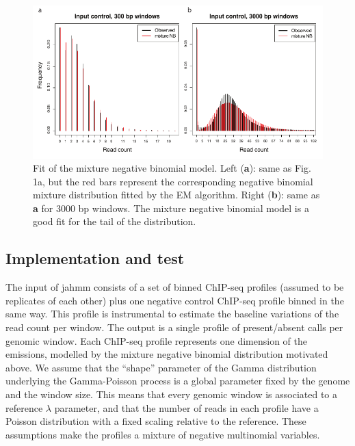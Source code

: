 \documentclass[12pt]{article}
\begin{document}
\begin{figure}
  \includegraphics[width=\textwidth]{Fig2.pdf}
  \caption{Fit of the mixture negative binomial model.
  Left (\textbf{a}): same as Fig. 1a, but the red bars represent the corresponding
  negative binomial mixture distribution fitted by the EM algorithm.
  Right (\textbf{b}): same as \textbf{a} for 3000 bp windows. The mixture negative
  binomial model is a good fit for the tail of the distribution.}
\end{figure}


\subsection{Implementation and test}
The input of jahmm consists of a set of binned ChIP-seq profiles (assumed to be replicates of each other) plus one negative control ChIP-seq profile binned in the same way. This profile is instrumental to estimate the baseline variations of the read count per window.
The output is a single profile of present/absent calls per genomic window. Each ChIP-seq profile represents one dimension of the emissions, modelled by the mixture negative binomial distribution motivated above. We assume that the ``shape'' parameter of the Gamma distribution underlying the Gamma-Poisson process is a global parameter fixed by the genome and the window size. This means that every genomic window is associated to a reference $\lambda$ parameter, and that the number of reads in each profile have a Poisson distribution with a fixed scaling relative to the reference. These assumptions make the profiles a mixture of negative multinomial variables.
\end{document}
